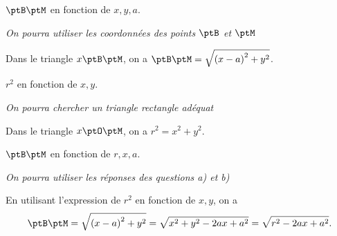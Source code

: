 \begin{enonce}
	$\ptB\ptM$ en fonction de $x,y,a$. \minusMedskip
	
	{\itshape On pourra utiliser les coordonnées des points $\ptB$ et $\ptM$}
\end{enonce}


\begin{corrige}
	Dans le triangle $x\ptB\ptM$, on a  $\ptB\ptM =  \sqrt{ \left(x - a\right)^2 + y^2}$.
\end{corrige}





\begin{enonce}
\label{enonce_2}
	$r^2$ en fonction de $x,y$. \minusMedskip
	
	{\itshape On pourra chercher un triangle rectangle adéquat}
\end{enonce}


\begin{corrige}
	Dans le triangle $x\ptO\ptM$, on a   $r^2 = x^2 + y^2$.
\end{corrige}





\begin{enonce}
	$\ptB\ptM$ en fonction de $r,x,a$. \minusMedskip
	
	{\itshape On pourra utiliser  les réponses des questions a) et b)}
\end{enonce}


\begin{corrige}
	En utilisant l'expression de $r^2$ en fonction de $x,y$, on a 
	\[
		\ptB\ptM =  \sqrt{ \left(x - a\right)^2 + y^2} =
		\sqrt{ x^2 + y^2 - 2ax + a^2} = \sqrt{ r^2 - 2ax + a^2 }.
	\]
\end{corrige}





